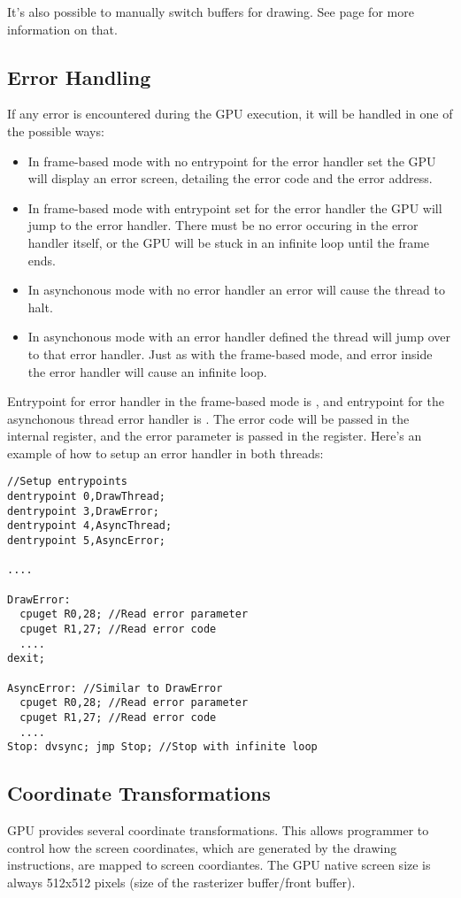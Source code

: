 It's also possible to manually switch buffers for drawing. See page \pageref{gpubuffers} for more information on that.

\subsection{Error Handling}
If any error is encountered during the GPU execution, it will be handled in one of the possible ways:
\begin{itemize}
	\item In frame-based mode with no entrypoint for the error handler set the GPU will display an error screen, detailing the error code and the error address.
	\item In frame-based mode with entrypoint set for the error handler the GPU will jump to the error handler. There must be no error occuring in the error handler itself, or the GPU will be stuck in an infinite loop until the frame ends.
	\item In asynchonous mode with no error handler an error will cause the thread to halt.
	\item In asynchonous mode with an error handler defined the thread will jump over to that error handler. Just as with the frame-based mode, and error inside the error handler will cause an infinite loop.
\end{itemize}

Entrypoint for error handler in the frame-based mode is , and entrypoint for the asynchonous thread error handler is . The error code will be passed in the  internal register, and the error parameter is passed in the  register. Here's an example of how to setup an error handler in both threads:
\begin{verbatim}
//Setup entrypoints
dentrypoint 0,DrawThread;
dentrypoint 3,DrawError;
dentrypoint 4,AsyncThread;
dentrypoint 5,AsyncError;

....

DrawError:
  cpuget R0,28; //Read error parameter
  cpuget R1,27; //Read error code
  ....
dexit;

AsyncError: //Similar to DrawError
  cpuget R0,28; //Read error parameter
  cpuget R1,27; //Read error code
  ....
Stop: dvsync; jmp Stop; //Stop with infinite loop
\end{verbatim}

\subsection{Coordinate Transformations}
GPU provides several coordinate transformations. This allows programmer to control how the screen coordinates, which are generated by the drawing instructions, are mapped to screen coordiantes. The GPU native screen size is always 512x512 pixels (size of the rasterizer buffer/front buffer).

